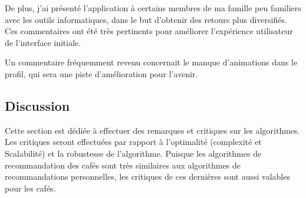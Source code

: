 \documentclass[11pt]{article}
\begin{document}
De plus, j'ai présenté l'application à certains membres de ma famille peu familiers avec les outils informatiques, dans le but d'obtenir des retours plus diversifiés. Ces commentaires ont été très pertinents pour améliorer l'expérience utilisateur de l'interface initiale.\

Un commentaire fréquemment revenu concernait le manque d'animations dans le profil, qui sera une piste d'amélioration pour l'avenir.

\subsection{Discussion}
\label{discussion}
Cette section est dédiée à effectuer des remarques et critiques sur les algorithmes. Les critiques seront effectuées par rapport à l'optimalité (complexité et Scalabilité) et la robustesse de l'algorithme. Puisque les algorithmes de recommandation des cafés sont très similaires aux algorithmes de recommandations personnelles, les critiques de ces dernières sont aussi valables pour les cafés.
\end{document}
